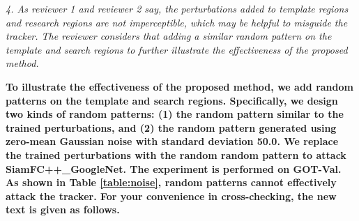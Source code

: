 \documentclass[12pt]{article}
\begin{document}
\textit{4. As reviewer 1 and reviewer 2 say, the perturbations added to template regions and research regions are not imperceptible, which may be helpful to misguide the tracker. The reviewer considers that adding a similar random pattern on the template and search regions to further illustrate the effectiveness of the proposed method.}

\textbf{To illustrate the effectiveness of the proposed method, we add random patterns on the template and search regions. 
Specifically, we design two kinds of random patterns: (1) the random pattern similar to the trained perturbations, and (2) the random pattern generated using zero-mean Gaussian noise with standard deviation 50.0.
We replace the trained perturbations with the random random pattern to attack SiamFC++\_GoogleNet. The experiment is performed on GOT-Val.
As shown in Table \ref{table:noise}, random patterns cannot effectively attack the tracker.
For your convenience in cross-checking, the new text is given as follows.
}
\end{document}
